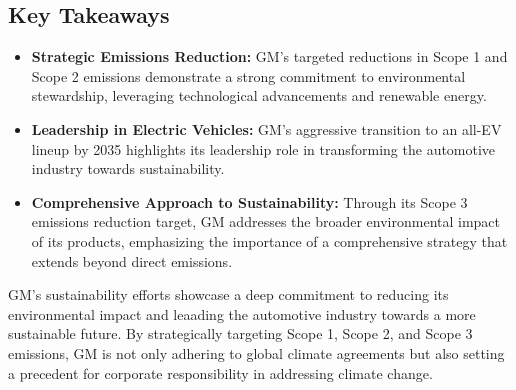 \subsection*{Key Takeaways}
\begin{itemize}
    \item \textbf{Strategic Emissions Reduction:} GM's targeted reductions in Scope 1 and Scope 2 emissions demonstrate a strong commitment to environmental stewardship, leveraging technological advancements and renewable energy.
    \item \textbf{Leadership in Electric Vehicles:} GM's aggressive transition to an all-EV lineup by 2035 highlights its leadership role in transforming the automotive industry towards sustainability.
    \item \textbf{Comprehensive Approach to Sustainability:} Through its Scope 3 emissions reduction target, GM addresses the broader environmental impact of its products, emphasizing the importance of a comprehensive strategy that extends beyond direct emissions.
\end{itemize}

GM's sustainability efforts showcase a deep commitment to reducing its environmental impact and leaading the automotive industry towards a more sustainable future. By strategically targeting Scope 1, Scope 2, and Scope 3 emissions, GM is not only adhering to global climate agreements but also setting a precedent for corporate responsibility in addressing climate change.




